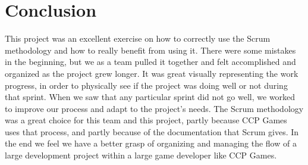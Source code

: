 \section{Conclusion}\label{sec:conclusion}
This project was an excellent exercise on how to correctly use the Scrum methodology and how to really benefit from using it. There were some mistakes in the beginning, but we as a team pulled it together and felt accomplished and organized as the project grew longer. It was great visually representing the work progress, in order to physically see if the project was doing well or not during that sprint. When we saw that any particular sprint did not go well, we worked to improve our process and adapt to the project's needs. The Scrum methodology was a great choice for this team and this project, partly because CCP Games uses that process, and partly because of the documentation that Scrum gives. In the end we feel we have a better grasp of organizing and managing the flow of a large development project within a large game developer like CCP Games.